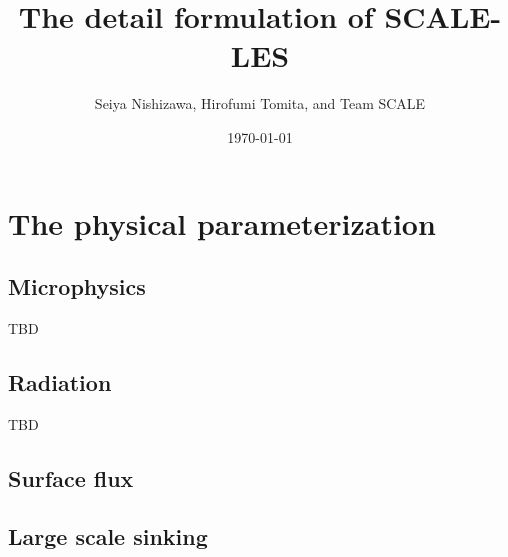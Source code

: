 \documentclass[a4paper]{report}
\title{{\LARGE The detail formulation of SCALE-LES}}
\author{Seiya Nishizawa, Hirofumi Tomita, and Team SCALE}
\date{\today}
\begin{document}
\maketitle
\tableofcontents











\chapter{The physical parameterization}


\section{Microphysics}
{\Huge TBD}

\section{Radiation}
{\Huge TBD}

\section{Surface flux}


\section{Large scale sinking}




\appendix






\end{document}
